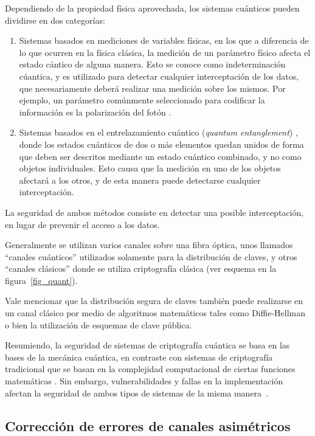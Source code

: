 Dependiendo de la propiedad física aprovechada, los sistemas cuánticos pueden dividirse en dos categorías:
\begin{enumerate}
 \item Sistemas basados en mediciones de variables físicas, en los que a diferencia de lo que ocurren en la física clásica, la medición de un parámetro físico afecta el estado cántico de alguna manera. Esto se conoce como indeterminación cúantica, y es utilizado para detectar cualquier interceptación de los datos, que necesariamente deberá realizar una medición sobre los mismos. Por ejemplo, un parámetro comúnmente seleccionado para codificar la información es la polarización del fotón \cite{muller1993experimental}.
 \item Sistemas basados en el entrelazamiento cuántico (\textit{quantum entanglement}) \cite{jennewein2000quantum}, donde los estados cuánticos de dos o más elementos quedan unidos de forma que deben ser descritos mediante un estado cuántico combinado, y no como objetos individuales. Esto causa que la medición en uno de los objetos afectará a los otros, y de esta manera puede detectarse cualquier interceptación.
\end{enumerate}

La seguridad de ambos métodos consiste en detectar una posible interceptación, en lugar de prevenir el acceso a los datos.

Generalmente se utilizan varios canales sobre una fibra óptica, unos llamados ``canales cuánticos'' utilizados solamente para la distribución de claves, y otros ``canales clásicos'' donde se utiliza criptografía clásica (ver esquema en la figura~\ref{fig_quant}).

Vale mencionar que la distribución segura de claves también puede realizarse en un canal clásico por medio de algoritmos matemáticos tales como Diffie-Hellman~\cite{diffie1976new} o bien la utilización de esquemas de clave pública.

Resumiendo, la seguridad de sistemas de criptografía cuántica se basa en las bases de la mecánica cuántica, en contraste con sistemas de criptografía tradicional que se basan en la complejidad computacional de ciertas funciones matemáticas \cite{kohnfelder1978towards}. Sin embargo, vulnerabilidades y fallas en la implementación afectan la seguridad de ambos tipos de sistemas de la misma manera~\cite{lydersen2010hacking}.


\subsection{Corrección de errores de canales asimétricos}

